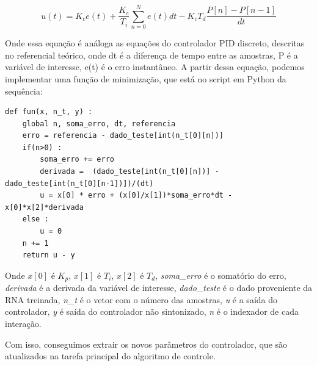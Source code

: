 \begin{equation}\label{eq:motor_accel}
u(t) = K_c e(t) + \frac{K_c}{T_i}\sum_{n=0}^{N}{e(t)dt}-K_cT_d\frac{P[n]-P[n-1]}{dt}
\end{equation}

Onde essa equação é análoga as equações do controlador PID discreto, descritas no referencial teórico, onde dt é a diferença de tempo entre as amostras, P é a variável de interesse, e(t) é o erro instantâneo. A partir dessa equação, podemos implementar uma função de minimização, que está no script em Python da sequência:


\begin{lstlisting}[caption={Algoritmo I: Minimização da Função do Controlador}]
def fun(x, n_t, y) :
    global n, soma_erro, dt, referencia
    erro = referencia - dado_teste[int(n_t[0][n])]
    if(n>0) :
        soma_erro += erro
        derivada =  (dado_teste[int(n_t[0][n])] -  dado_teste[int(n_t[0][n-1])])/(dt)
        u = x[0] * erro + (x[0]/x[1])*soma_erro*dt - x[0]*x[2]*derivada
    else : 
        u = 0
    n += 1
    return u - y
\end{lstlisting}

Onde $x[0]$ é \textit{$K_p$}, $x[1]$ é \textit{$T_i$}, $x[2]$ é \textit{$T_d$}, \textit{soma\_erro} é o somatório do erro, \textit{derivada} é a derivada da variável de interesse, \textit{dado\_teste} é o dado proveniente da RNA treinada, \textit{n\_t} é o vetor com o número das amostras, \textit{u} é a saída do controlador, \textit{y} é saída do controlador não sintonizado, \textit{n} é o indexador de cada interação.

Com isso, conseguimos extrair os novos parâmetros do controlador, que são atualizados na tarefa principal do algoritmo de controle.

